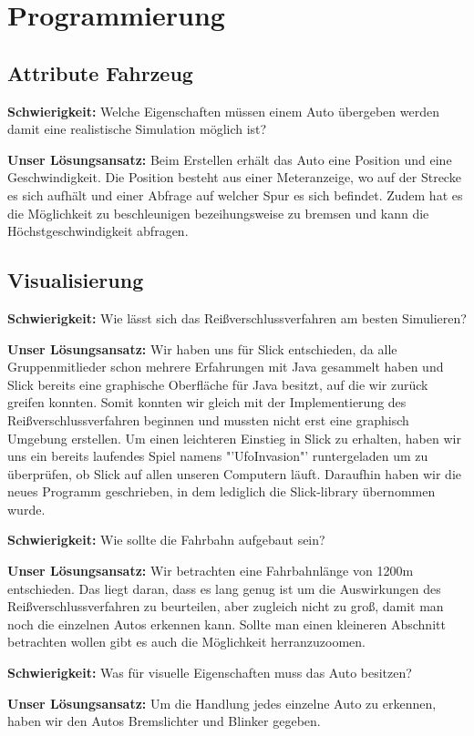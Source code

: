 \chapter{Programmierung}
\section{Attribute Fahrzeug}
\textbf{Schwierigkeit:} Welche Eigenschaften müssen einem Auto übergeben werden damit eine realistische Simulation möglich ist?
\begin{addmargin}[25pt]{0pt}
	\item \textbf{Unser Lösungsansatz:} Beim Erstellen erhält das Auto eine Position und eine Geschwindigkeit. Die Position besteht aus einer Meteranzeige, wo auf der Strecke es sich aufhält und einer Abfrage auf welcher Spur es sich befindet. Zudem hat es die Möglichkeit zu beschleunigen bezeihungsweise zu bremsen und kann die Höchstgeschwindigkeit abfragen. \\
\end{addmargin}

\section{Visualisierung}
\textbf{Schwierigkeit:} Wie lässt sich das Reißverschlussverfahren am besten Simulieren?
\begin{addmargin}[25pt]{0pt}
	\item \textbf{Unser Lösungsansatz:} Wir haben uns für Slick entschieden, da alle Gruppenmitlieder schon mehrere Erfahrungen mit Java gesammelt haben und Slick bereits eine graphische Oberfläche für Java besitzt, auf die wir zurück greifen konnten. Somit konnten wir gleich mit der Implementierung des Reißverschlussverfahren beginnen und mussten nicht erst eine graphisch Umgebung erstellen. Um einen leichteren Einstieg in Slick zu erhalten, haben wir uns ein bereits laufendes Spiel namens "'UfoInvasion"' runtergeladen um zu überprüfen, ob Slick auf allen unseren Computern läuft. Daraufhin haben wir die neues Programm geschrieben, in dem lediglich die Slick-library übernommen wurde. \\
\end{addmargin}
\textbf{Schwierigkeit:} Wie sollte die Fahrbahn aufgebaut sein?
\begin{addmargin}[25pt]{0pt}
	\item \textbf{Unser Lösungsansatz:} Wir betrachten eine Fahrbahnlänge von 1200m entschieden. Das liegt daran, dass es lang genug ist um die Auswirkungen des Reißverschlussverfahren zu beurteilen, aber zugleich nicht zu groß, damit man noch die einzelnen Autos erkennen kann. Sollte man einen kleineren Abschnitt betrachten wollen gibt es auch die Möglichkeit herranzuzoomen.\\
\end{addmargin}
\textbf{Schwierigkeit:} Was für visuelle Eigenschaften muss das Auto besitzen?
\begin{addmargin}[25pt]{0pt}
	\item \textbf{Unser Lösungsansatz:} Um die Handlung jedes einzelne Auto zu erkennen, haben wir den Autos Bremslichter und Blinker gegeben.\\
\end{addmargin}

